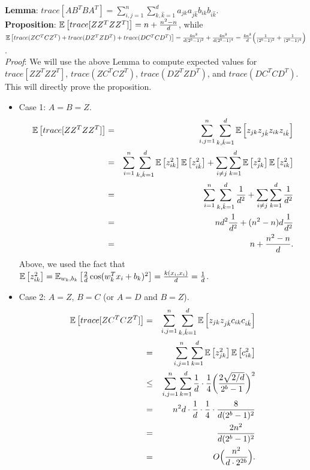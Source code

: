 \documentclass[12pt]{article}
\newcommand{\hk}{\hat{k}}
\begin{document}
\noindent\textbf{Lemma}: $trace[AB^TBA^T] = \sum_{i,j=1}^n \sum_{k,\hk=1}^d a_{jk}a_{j\hk}b_{ik}b_{i\hk}$.\\

\noindent \textbf{Proposition}:  $\expect{}{trace[ZZ^TZZ^T]} = n + \frac{n^2-n}{d}$, while 
$\expect{}{trace(ZC^TCZ^T) + trace(DZ^TZD^T) + trace(DC^TCD^T)} = \frac{4n^2}{d(2^b-1)^2} + \frac{4n^2}{d(2^b-1)^4} = \frac{4n^2}{d}\Big(\frac{1}{(2^b-1)^2} + \frac{1}{(2^b-1)^4}\Big)$. \\

\noindent \textit{Proof}:  We will use the above Lemma to compute expected values for $trace[ZZ^TZZ^T]$, $trace(ZC^TCZ^T)$, $trace(DZ^TZD^T)$, and $trace(DC^TCD^T)$.  This will directly prove the proposition.

\begin{itemize}
\item Case 1: $A=B=Z$.
\begin{eqnarray*}
\expect{}{trace[ZZ^TZZ^T]} &=& \sum_{i,j=1}^n \sum_{k,\hk=1}^d \expect{}{z_{jk}z_{j\hk}z_{ik}z_{i\hk}}\\
&=& \sum_{i=1}^n \sum_{k,\hk=1}^d \expect{}{z_{ik}^2}\expect{}{z_{i\hk}^2} + \sum_{i\neq j} \sum_{k=1}^d \expect{}{z_{jk}^2}\expect{}{z_{ik}^2}\\
&=& \sum_{i=1}^n \sum_{k,\hk=1}^d \frac{1}{d^2} + \sum_{i\neq j} \sum_{k=1}^d \frac{1}{d^2}\\
&=& nd^2\frac{1}{d^2} + (n^2-n)d\frac{1}{d^2}\\
&=& n + \frac{n^2-n}{d}.
\end{eqnarray*}
Above, we used the fact that $\expect{}{z_{ik}^2} = \expect{w_k,b_k}{\frac{2}{d}\cos(w_k^T x_i + b_k)^2} = \frac{k(x_i,x_i)}{d} = \frac{1}{d}$.
\item Case 2: $A=Z$, $B=C$ (or $A=D$ and $B=Z$).
\begin{eqnarray*}
\expect{}{trace[ZC^TCZ^T]} &=& \sum_{i,j=1}^n \sum_{k,\hk=1}^d \expect{}{z_{jk}z_{j\hk}c_{ik}c_{i\hk}}\\	
&=& \sum_{i,j=1}^n \sum_{k=1}^d \expect{}{z_{jk}^2}\expect{}{c_{ik}^2}\\	
&\leq& \sum_{i,j=1}^n \sum_{k=1}^d \frac{1}{d}\cdot \frac{1}{4}\bigg(\frac{2\sqrt{2/d}}{2^b-1}\bigg)^2\\	
&=& n^2d \cdot \frac{1}{d}\cdot \frac{1}{4}\cdot \frac{8}{d(2^b-1)^2}\\	
&=& \frac{2n^2}{d(2^b-1)^2} \\
&=& O\Big(\frac{n^2}{d\cdot 2^{2b}}\Big).

\end{eqnarray*}
\end{itemize}
\end{document}
